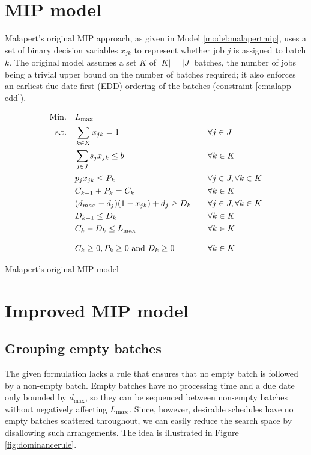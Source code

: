 \section{MIP model}
Malapert's original MIP approach, as given in Model \ref{model:malapertmip},
uses a set of binary decision variables $x_{jk}$ to represent whether job $j$ is
assigned to batch $k$. The original model assumes a set $K$ of $|K| = |J|$
batches, the number of jobs being a trivial upper bound on the number of
batches required; it also enforces an earliest-due-date-first (EDD) ordering of
the batches (constraint \ref{c:malapp-edd}).
\begin{model}[h]
\begin{alignat}{2}
\mathrm{Min.}\quad & L_{\text{max}} && \\
\mathrm{s.t.}\quad &\sum_{k \in K} x_{jk} = 1 \quad && \forall j \in J \\
  &\sum_{j \in J} s_j x_{jk} \leq b \quad && \forall k \in K\\
  &p_j x_{jk} \leq P_k \quad && \forall j \in J, \forall k \in K\\
  &C_{k-1} + P_{k} = C_k \quad && \forall k \in K\\
  &(d_{max} - d_j)(1 - x_{jk}) + d_j \geq D_k \quad && \forall j \in J, \forall k \in K\\
  &D_{k-1} \leq D_k \quad && \forall k \in K \label{c:malapp-edd} \\
  &C_k - D_k \leq L_{\text{max}} \quad && \forall k \in K\\[2ex]
  &C_k \geq 0, P_k \geq 0 \text{ and } D_k \geq 0 \quad && \forall k \in K  
\end{alignat}
\caption{Malapert's original MIP model}
\label{model:malapertmip}
\end{model}

\section{Improved MIP model}
\subsection{Grouping empty batches}
The given formulation lacks a rule that ensures that no empty batch is followed by a non-empty batch. Empty batches have no processing time and a due date only bounded by $d_\text{max}$, so they can be sequenced between non-empty batches without negatively affecting $L_{\text{max}}$. Since, however, desirable schedules have no empty batches scattered throughout, we can easily reduce the search space by disallowing such arrangements. The idea is illustrated in Figure \ref{fig:dominancerule}.

